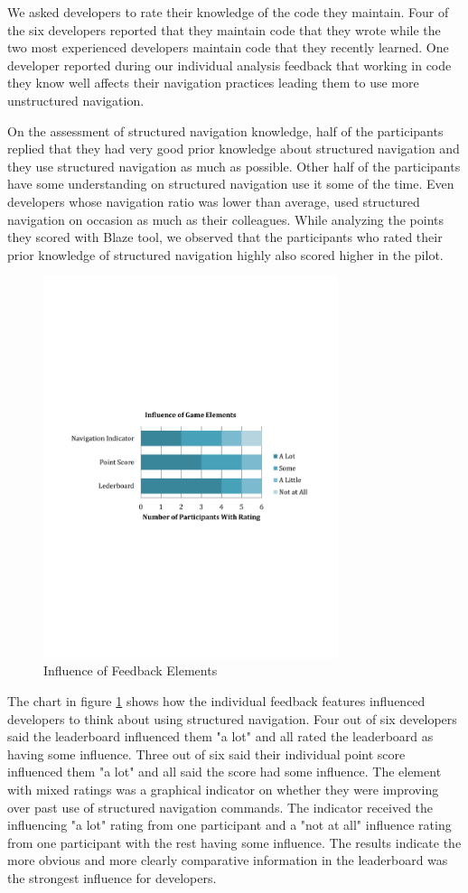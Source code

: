 \documentclass{sig-alternate}
\begin{document}
We asked developers to rate their knowledge of the code they maintain.  Four of the six developers reported that they maintain code that they wrote while the two most experienced developers maintain code that they recently learned.  One developer reported during our individual analysis feedback that working in code they know well affects their navigation practices leading them to use more unstructured navigation.

On the assessment of structured navigation knowledge, half of the participants replied that they had very good prior knowledge about structured navigation and they use structured navigation as much as possible.  Other half of the participants have some understanding on structured navigation use it some of the time. Even developers whose navigation ratio  was lower than average, used structured navigation on occasion  as much as their colleagues.  While analyzing the points they scored with Blaze tool, we observed that the participants who rated their prior knowledge of structured navigation highly also scored higher in the pilot. 

\begin{figure}
	\includegraphics[width=3.4in]{ElementInfluenceChart.pdf}
	\caption{Influence of Feedback Elements}
	\label{fig:elementInfluence}
\end{figure}

The chart in figure \ref{fig:elementInfluence} shows how the individual feedback features influenced developers to think about using structured navigation.  Four out of six developers said the leaderboard influenced them "a lot" and all rated the leaderboard as having some influence.  Three out of six  said their individual point score influenced them "a lot" and all said the score had some influence.  The element with mixed ratings was a graphical indicator on whether they were improving over past use of structured navigation commands.  The indicator received the influencing "a lot" rating from one participant and a "not at all" influence rating from one participant with the rest having some influence.  The results indicate the more obvious and more clearly comparative information in the leaderboard was the strongest influence for developers.
\end{document}
